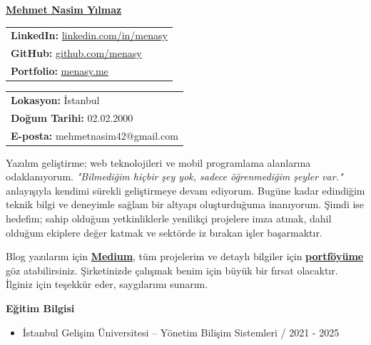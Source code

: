 \documentclass[a4paper,11pt]{article}
\begin{document}
\vspace*{-6.5em}
\begin{center}
    \href{https://menasy.me/}{\LARGE \textbf{Mehmet Nasim Yılmaz}}
\end{center}
\vspace*{0.5em}
\noindent
\begin{minipage}[t]{0.48\textwidth}
    \begin{tabular}{@{}l}
        \textbf{LinkedIn:} \href{https://linkedin.com/in/menasy}{linkedin.com/in/menasy} \\
        \textbf{GitHub:} \href{https://github.com/menasy}{github.com/menasy} \\
        \textbf{Portfolio:} \href{https://menasy.me/}{menasy.me} \\
    \end{tabular}
\end{minipage}%
\hfill
\begin{minipage}[t]{0.48\textwidth}
    \raggedleft
    \begin{tabular}{@{}l}
        \textbf{Lokasyon:} İstanbul \\
        \textbf{Doğum Tarihi:} 02.02.2000 \\
        \textbf{E-posta:} mehmetnasim42@gmail.com \\
    \end{tabular}
\end{minipage}

\vspace{0.5em}

Yazılım geliştirme; web teknolojileri ve mobil programlama alanlarına odaklanıyorum. \textit{"Bilmediğim hiçbir şey yok, sadece öğrenmediğim şeyler var."} anlayışıyla kendimi sürekli geliştirmeye devam ediyorum. Bugüne kadar edindiğim teknik bilgi ve deneyimle sağlam bir altyapı oluşturduğuma inanıyorum. Şimdi ise hedefim; sahip olduğum yetkinliklerle yenilikçi projelere imza atmak, dahil olduğum ekiplere değer katmak ve sektörde iz bırakan işler başarmaktır.
\vspace{-0.2em}

Blog yazılarım için \textbf{\href{https://medium.com/@menasy}{Medium}}, tüm projelerim ve detaylı bilgiler için \textbf{\href{https://menasy.me/}{portföyüme}} göz atabilirsiniz. Şirketinizde çalışmak benim için büyük bir fırsat olacaktır. İlginiz için teşekkür eder, saygılarımı sunarım.

\vspace{-0.1em}

\textbf{Eğitim Bilgisi}
\vspace{-0.5em}
\begin{itemize}
  \item İstanbul Gelişim Üniversitesi – Yönetim Bilişim Sistemleri / 2021 - 2025
\end{itemize}
\end{document}
